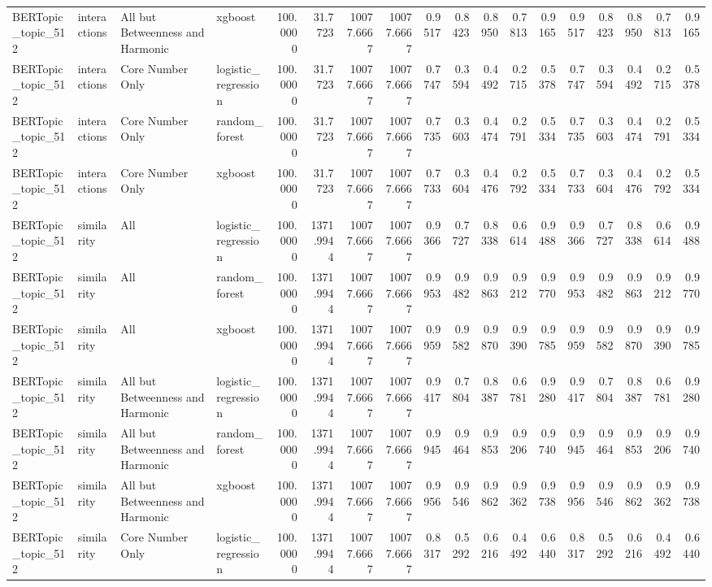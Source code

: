 \begin{tabular}{llllrrrrrrrrrrrrrr}
BERTopic_topic_512 & interactions & All but Betweenness and Harmonic & xgboost & 100.0000 & 31.7723 & 10077.6667 & 10077.6667 & 0.9517 & 0.8423 & 0.8950 & 0.7813 & 0.9165 & 0.9517 & 0.8423 & 0.8950 & 0.7813 & 0.9165 \\
BERTopic_topic_512 & interactions & Core Number Only & logistic_regression & 100.0000 & 31.7723 & 10077.6667 & 10077.6667 & 0.7747 & 0.3594 & 0.4492 & 0.2715 & 0.5378 & 0.7747 & 0.3594 & 0.4492 & 0.2715 & 0.5378 \\
BERTopic_topic_512 & interactions & Core Number Only & random_forest & 100.0000 & 31.7723 & 10077.6667 & 10077.6667 & 0.7735 & 0.3603 & 0.4474 & 0.2791 & 0.5334 & 0.7735 & 0.3603 & 0.4474 & 0.2791 & 0.5334 \\
BERTopic_topic_512 & interactions & Core Number Only & xgboost & 100.0000 & 31.7723 & 10077.6667 & 10077.6667 & 0.7733 & 0.3604 & 0.4476 & 0.2792 & 0.5334 & 0.7733 & 0.3604 & 0.4476 & 0.2792 & 0.5334 \\
BERTopic_topic_512 & similarity & All & logistic_regression & 100.0000 & 1371.9944 & 10077.6667 & 10077.6667 & 0.9366 & 0.7727 & 0.8338 & 0.6614 & 0.9488 & 0.9366 & 0.7727 & 0.8338 & 0.6614 & 0.9488 \\
BERTopic_topic_512 & similarity & All & random_forest & 100.0000 & 1371.9944 & 10077.6667 & 10077.6667 & 0.9953 & 0.9482 & 0.9863 & 0.9212 & 0.9770 & 0.9953 & 0.9482 & 0.9863 & 0.9212 & 0.9770 \\
BERTopic_topic_512 & similarity & All & xgboost & 100.0000 & 1371.9944 & 10077.6667 & 10077.6667 & 0.9959 & 0.9582 & 0.9870 & 0.9390 & 0.9785 & 0.9959 & 0.9582 & 0.9870 & 0.9390 & 0.9785 \\
BERTopic_topic_512 & similarity & All but Betweenness and Harmonic & logistic_regression & 100.0000 & 1371.9944 & 10077.6667 & 10077.6667 & 0.9417 & 0.7804 & 0.8387 & 0.6781 & 0.9280 & 0.9417 & 0.7804 & 0.8387 & 0.6781 & 0.9280 \\
BERTopic_topic_512 & similarity & All but Betweenness and Harmonic & random_forest & 100.0000 & 1371.9944 & 10077.6667 & 10077.6667 & 0.9945 & 0.9464 & 0.9853 & 0.9206 & 0.9740 & 0.9945 & 0.9464 & 0.9853 & 0.9206 & 0.9740 \\
BERTopic_topic_512 & similarity & All but Betweenness and Harmonic & xgboost & 100.0000 & 1371.9944 & 10077.6667 & 10077.6667 & 0.9956 & 0.9546 & 0.9862 & 0.9362 & 0.9738 & 0.9956 & 0.9546 & 0.9862 & 0.9362 & 0.9738 \\
BERTopic_topic_512 & similarity & Core Number Only & logistic_regression & 100.0000 & 1371.9944 & 10077.6667 & 10077.6667 & 0.8317 & 0.5292 & 0.6216 & 0.4492 & 0.6440 & 0.8317 & 0.5292 & 0.6216 & 0.4492 & 0.6440 \\

\end{tabular}
